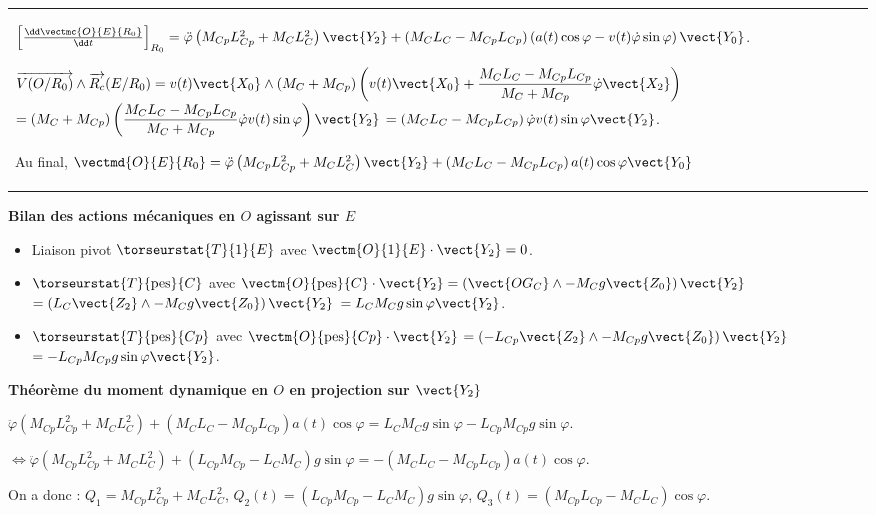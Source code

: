 \begin{corrige}
\begin{tabular}{|p{.9\linewidth}}
$\left[\frac{\dd \vectmc{O}{E}{R_0}}{\dd t}\right]_{R_0} =\ddot{\varphi}\left(M_{Cp}L_{Cp}^2+M_{C}L_{C}^2 \right)\vect{Y_2}+\left( M_CL_C-M_{Cp}L_{Cp}\right) \left( a(t)\cos\varphi - v(t)\dot{\varphi}\sin\varphi \right)\vect{Y_0}$.

$\overrightarrow{V(O/R_0)}\wedge \overrightarrow{R_c}(E/R_0) =v(t)\vect{X_0} \wedge \left(M_C+M_{Cp}\right) \left( v(t)\vect{X_0}+\dfrac{M_CL_C-M_{Cp}L_{Cp}}{M_C+M_{Cp}}\dot{\varphi}\vect{X_2} \right)$
$=\left(M_C+M_{Cp}\right) \left( \dfrac{M_CL_C-M_{Cp}L_{Cp}}{M_C+M_{Cp}}\dot{\varphi}v(t)\sin\varphi  \right)\vect{Y_2} $
$=\left( M_CL_C-M_{Cp}L_{Cp}  \right)\dot{\varphi}v(t)\sin\varphi\vect{Y_2} $.

Au final, $\vectmd{O}{E}{R_0}=\ddot{\varphi}\left(M_{Cp}L_{Cp}^2+M_{C}L_{C}^2 \right)\vect{Y_2}+\left( M_CL_C-M_{Cp}L_{Cp}\right)  a(t)\cos\varphi \vect{Y_0}$
\\

\end{tabular}

\textbf{Bilan des actions mécaniques en $O$ agissant sur $E$}
\begin{itemize}
\item Liaison pivot $\torseurstat{T}{1}{E}$ avec $\vectm{O}{1}{E}\cdot \vect{Y_2}=0$. 
\item $\torseurstat{T}{\text{pes}}{C}$ avec $\vectm{O}{\text{pes}}{C}\cdot \vect{Y_2}=\left( \vect{OG_C}\wedge -M_Cg \vect{Z_0}\right) \vect{Y_2}$ $=\left( L_C\vect{Z_2}\wedge -M_Cg \vect{Z_0}\right) \vect{Y_2}$
$= L_CM_Cg \sin \varphi  \vect{Y_2}$. 
\item $\torseurstat{T}{\text{pes}}{Cp}$ avec $\vectm{O}{\text{pes}}{Cp}\cdot \vect{Y_2}$%
$=\left( -L_{Cp}\vect{Z_2}\wedge -M_{Cp}g \vect{Z_0}\right) \vect{Y_2}$
$=- L_{Cp}M_{Cp}g \sin \varphi  \vect{Y_2}$. 
\end{itemize}

\textbf{Théorème du moment dynamique en $O$ en projection sur $\vect{Y_2}$}

$\ddot{\varphi}\left(M_{Cp}L_{Cp}^2+M_{C}L_{C}^2 \right)+\left( M_CL_C-M_{Cp}L_{Cp}\right)  a(t)\cos\varphi =
 L_CM_Cg \sin \varphi- L_{Cp}M_{Cp}g \sin \varphi $.

$\Leftrightarrow \ddot{\varphi}\left(M_{Cp}L_{Cp}^2+M_{C}L_{C}^2 \right)
+\left(   L_{Cp}M_{Cp} - L_CM_C \right)g \sin \varphi=
  - \left( M_CL_C-M_{Cp}L_{Cp}\right)  a(t)\cos\varphi $.

On a donc : 
$Q_1 = M_{Cp}L_{Cp}^2+M_{C}L_{C}^2 $, $Q_2(t)=\left(   L_{Cp}M_{Cp} - L_CM_C \right)g \sin \varphi$, 
$Q_3(t)= \left(M_{Cp}L_{Cp}- M_CL_C\right)  \cos\varphi$.
\end{corrige}
\else
\fi
 
